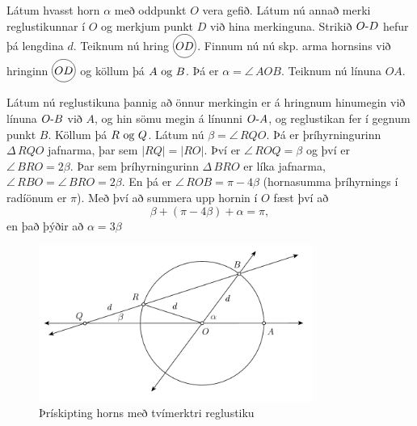 \begin{frame}[allowframebreaks]
  \begin{smid}
    \label{smid:thriskipting}
    Látum hvasst horn \(\alpha\)
    með oddpunkt \(O\)
    vera gefið. Látum nú annað merki reglustikunnar í \(O\)
    og merkjum punkt \(D\)
    við hina merkinguna. Strikið \(\lin{O}{D}\)
    hefur þá lengdina \(d\).
    Teiknum nú hring \(\hri{OD}\).
    Finnum nú nú skp. arma hornsins við hringinn \(\hri{OD}\)
    og köllum þá
    \(A \Og B\). Þá er \(\alpha = \angle\, AOB\). Teiknum nú línuna \(OA\).

    \theorembreak
    
    Látum nú reglustikuna þannig að önnur merkingin er á hringnum hinumegin
    við línuna \(\lin{O}{B}\) við \(A\), og hin sömu megin á línunni \(\lin{O}{A}\),
    og reglustikan fer í gegnum punkt \(B\). Köllum þá \(R \Og Q\). Látum nú
    \(\beta = \angle\, RQO\). Þá er þríhyrningurinn \(\Delta\, RQO\) jafnarma,
    þar sem \(|RQ| = |RO|\). Því er \(\angle\, ROQ = \beta\) og því er
    \(\angle\, BRO = 2 \beta\). Þar sem þríhyrningurinn \(\Delta\, BRO\)
    er líka jafnarma, \(\angle\, RBO = \angle\, BRO = 2\beta\). En þá er
    \(\angle\, ROB = \pi - 4\beta\) (hornasumma þríhyrnings í radíönum er \(\pi\)).
    Með því að summera upp hornin í \(O\) fæst því að
    \[ \beta + (\pi - 4\beta) + \alpha = \pi,\]
    en það þýðir að \(\alpha = 3\beta\)
  \end{smid}
\end{frame}

\begin{frame}
  \begin{figure}[H]
    \centering
    \includegraphics[width=0.8\textwidth]{TwiceNotched.png}
    \caption{Þrískipting horns með tvímerktri reglustiku}
    \label{fig:thriskipt}
  \end{figure}
\end{frame}

